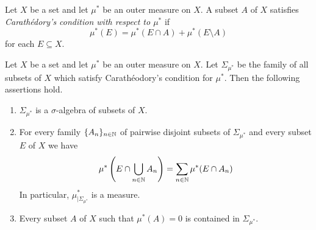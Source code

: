 \begin{definition}
    Let $X$ be a set and let $\mu^*$ be an outer measure on $X$. A subset $A$ of $X$ satisfies \textit{Carath{\'e}dory's condition with respect to $\mu^*$} if
    $$\mu^*(E)=\mu^*(E\cap A)+\mu^*(E\setminus A)$$
    for each $E\subseteq X$.
\end{definition}

\begin{theorem}\label{theorem:caratheodory_construction}
    Let $X$ be a set and let $\mu^*$ be an outer measure on $X$. Let $\Sigma_{\mu^*}$ be the family of all subsets of $X$ which satisfy Carath{\'e}odory's condition for $\mu^*$. Then the following assertions hold.
    \begin{enumerate}[label=\emph{\textbf{(\arabic*)}}, leftmargin=*]
        \item $\Sigma_{\mu^*}$ is a $\sigma$-algebra of subsets of $X$.
        \item For every family $\{A_n\}_{n\in {\mathbb N}}$ of pairwise disjoint subsets of $\Sigma_{\mu^*}$ and every subset $E$ of $X$ we have
              $$\mu^*\left(E\cap \bigcup_{n\in {\mathbb N}}A_n\right)=\sum_{n\in {\mathbb N}}\mu^*(E\cap A_n)$$
              In particular, $\mu^*_{\mid \Sigma_{\mu^*}}$ is a measure.
        \item Every subset $A$ of $X$ such that $\mu^*(A)=0$ is contained in $\Sigma_{\mu^*}$.
    \end{enumerate}
\end{theorem}

